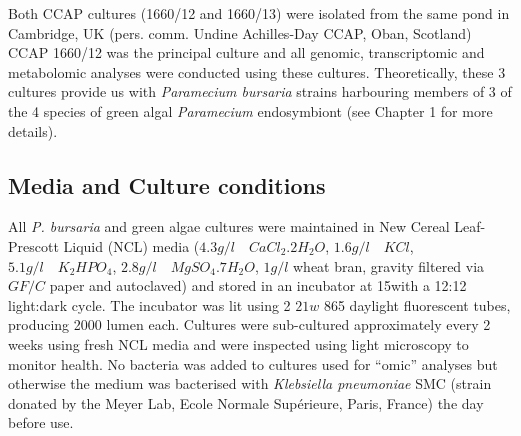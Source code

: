 Both CCAP cultures (1660/12 and 1660/13) were isolated from the same pond in Cambridge, UK (pers. comm. Undine Achilles-Day CCAP, Oban, Scotland)
CCAP 1660/12 was the principal culture and all genomic, transcriptomic and metabolomic analyses were conducted using these cultures. 
Theoretically, these 3 cultures provide us with \textit{Paramecium bursaria} strains harbouring members of 3 of the 4 species of 
green algal \textit{Paramecium} endosymbiont (see Chapter 1 for more details).

\subsection{Media and Culture conditions}
All \textit{P. bursaria} and green algae cultures were maintained in 
New Cereal Leaf-Prescott Liquid (NCL) media 
(\(4.3g/l \quad CaCl_{2}.2H_{2}O\), 
\(1.6g/l \quad KCl\), 
\(5.1g/l \quad K_{2}HPO_{4}\), 
\(2.8g/l \quad MgSO_{4}.7H_{2}O\), 
\(1g/l\) wheat bran, gravity filtered via \(GF/C\) paper and autoclaved) \citep{NCLCCAP} and stored in 
an incubator at 15\celsius with a 12:12 light:dark cycle.  The incubator was
lit using 2 \(21w\) 865 daylight fluorescent tubes, producing 2000 lumen each.
Cultures were sub-cultured approximately every 2 weeks using fresh NCL media and were inspected using light microscopy to monitor health.  
No bacteria was added to cultures used for ``omic'' analyses but otherwise the medium was bacterised with
\textit{Klebsiella pneumoniae} SMC (strain donated by the Meyer Lab, Ecole Normale Supérieure, Paris, France) the day before use. 

